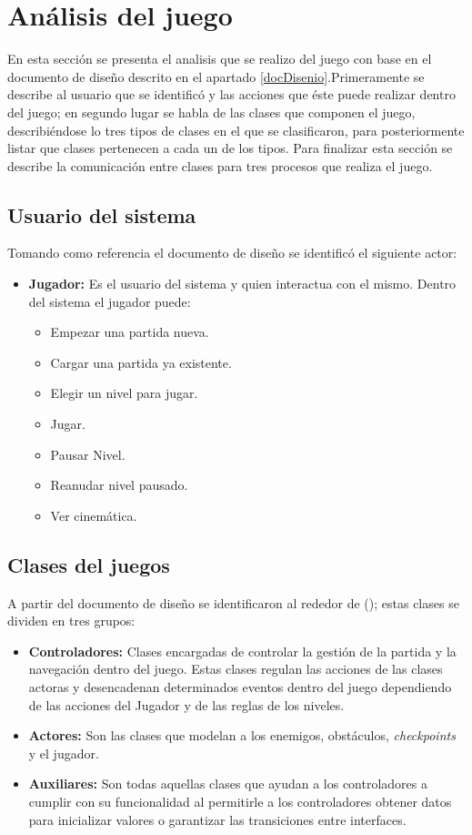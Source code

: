 \section{Análisis del juego}
En esta sección se presenta el analisis que se realizo del juego con base en el 
documento de diseño descrito en el apartado \ref{docDisenio}.Primeramente se 
describe al usuario que se identificó y las acciones que éste puede realizar 
dentro del juego; en segundo lugar se habla de las clases que componen el juego, 
describiéndose lo tres tipos de clases en el que se clasificaron, para 
posteriormente listar que clases pertenecen a cada un de los tipos. Para finalizar 
esta sección se describe la comunicación entre clases para tres procesos que 
realiza el juego. 

	\subsection{Usuario del sistema}
	Tomando como referencia el documento de diseño se identificó el siguiente actor:
	\begin{itemize}
		\item \textbf{Jugador:} Es el usuario del sistema y quien interactua con
		el mismo. Dentro del sistema el jugador puede: 
			\begin{itemize}
				\item Empezar una partida nueva.	
				\item Cargar una partida ya existente.
				\item Elegir un nivel para jugar.  
				\item Jugar.
				\item Pausar Nivel.
				\item Reanudar nivel pausado.
				\item Ver cinemática.
			\end{itemize}			   
	\end{itemize}	
	
	\subsection{Clases del juegos} \label{ClasesJuego}
	A partir del documento de diseño se identificaron al rededor de (); estas 
	clases se dividen en tres grupos:
		\begin{itemize}
			\item \textbf{Controladores:} Clases encargadas de controlar la gestión de 
			la partida y la navegación dentro del juego. Estas clases regulan las acciones 
			de las clases actoras y desencadenan determinados eventos dentro del juego
			dependiendo de las acciones del Jugador y de las reglas de los niveles.
			
			\item \textbf{Actores:} Son las clases que modelan a los enemigos, obstáculos,
			\textit{checkpoints} y el jugador.
			 
			 \item \textbf{Auxiliares:} Son todas aquellas clases que ayudan a los controladores
			 a cumplir con su funcionalidad al permitirle a los controladores obtener datos 
			 para inicializar valores o garantizar las transiciones entre interfaces.
		\end{itemize}
		
